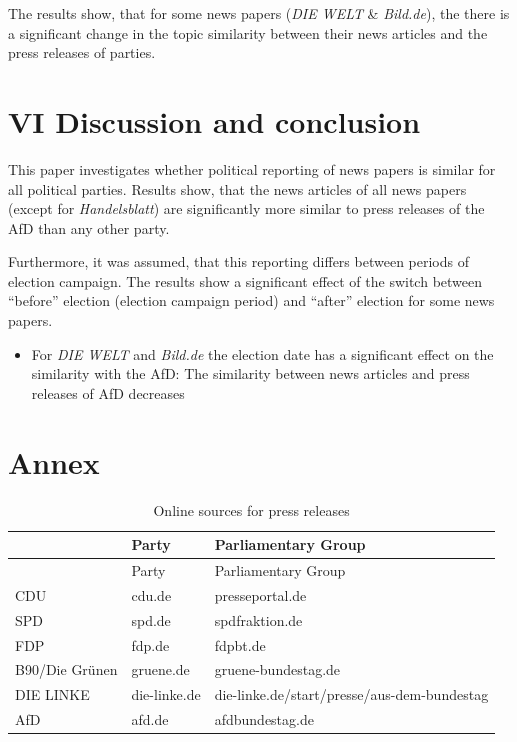 \documentclass[
]{article}
\providecommand{\tightlist}{%
  \setlength{\itemsep}{0pt}\setlength{\parskip}{0pt}}
\begin{document}
The results show, that for some news papers (\emph{DIE WELT} \&
\emph{Bild.de}), the there is a significant change in the topic
similarity between their news articles and the press releases of
parties.

\hypertarget{vi-discussion-and-conclusion}{%
\section{VI Discussion and
conclusion}\label{vi-discussion-and-conclusion}}

This paper investigates whether political reporting of news papers is
similar for all political parties. Results show, that the news articles
of all news papers (except for \emph{Handelsblatt}) are significantly
more similar to press releases of the AfD than any other party.

Furthermore, it was assumed, that this reporting differs between periods
of election campaign. The results show a significant effect of the
switch between ``before'' election (election campaign period) and
``after'' election for some news papers.

\begin{itemize}
\tightlist
\item
  For \emph{DIE WELT} and \emph{Bild.de} the election date has a
  significant effect on the similarity with the AfD: The similarity
  between news articles and press releases of AfD decreases
\end{itemize}

\newpage

\hypertarget{annex}{%
\section{Annex}\label{annex}}

\begin{longtable}[]{@{}lll@{}}
\caption{Online sources for press releases
\label{table:press_releases_sources}}\tabularnewline
\toprule
& Party & Parliamentary Group \\
\midrule
\endfirsthead
\toprule
& Party & Parliamentary Group \\
\midrule
\endhead
CDU & cdu.de & presseportal.de \\
SPD & spd.de & spdfraktion.de \\
FDP & fdp.de & fdpbt.de \\
B90/Die Grünen & gruene.de & gruene-bundestag.de \\
DIE LINKE & die-linke.de &
die-linke.de/start/presse/aus-dem-bundestag \\
AfD & afd.de & afdbundestag.de \\
\bottomrule
\end{longtable}
\end{document}

